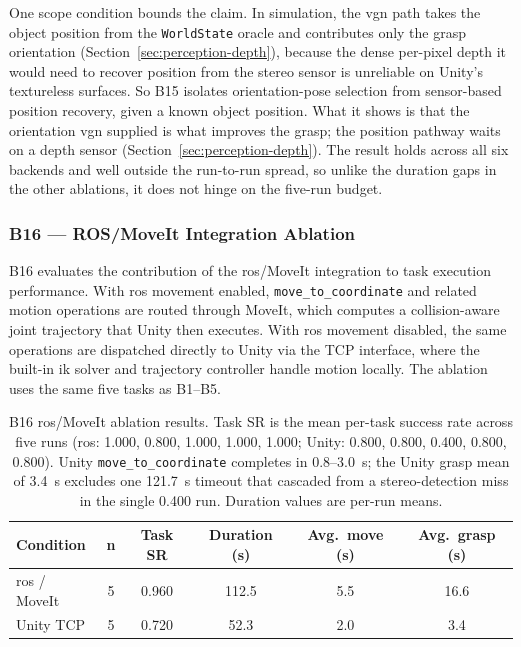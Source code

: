 \documentclass[
     12pt,
     a4paper,
     BCOR=10mm,
     DIV=14,
     listof=totoc,
     bibliography=totoc,
     parskip,
     twoside,
     headsepline
     ]{scrreprt}
\begin{document}
One scope condition bounds the claim. In simulation, the \gls{vgn} path takes the object position from the \texttt{WorldState} oracle and contributes only the grasp orientation (Section~\ref{sec:perception-depth}), because the dense per-pixel depth it would need to recover position from the stereo sensor is unreliable on Unity's textureless surfaces. So B15 isolates orientation-pose selection from sensor-based position recovery, given a known object position. What it shows is that the orientation \gls{vgn} supplied is what improves the grasp; the position pathway waits on a depth sensor (Section~\ref{sec:perception-depth}). The result holds across all six backends and well outside the run-to-run spread, so unlike the duration gaps in the other ablations, it does not hinge on the five-run budget.

\subsubsection{B16 --- ROS/MoveIt Integration Ablation}\label{sec:results-ros}
B16 evaluates the contribution of the \gls{ros}/MoveIt integration to task execution performance. With \gls{ros} movement enabled, \texttt{move\_to\_coordinate} and related motion operations are routed through MoveIt, which computes a collision-aware joint trajectory that Unity then executes. With \gls{ros} movement disabled, the same operations are dispatched directly to Unity via the TCP interface, where the built-in \gls{ik} solver and trajectory controller handle motion locally. The ablation uses the same five tasks as B1--B5.

\begin{table}[ht]
	\centering
	\begin{tabular}{lccccc}
		\hline
		\textbf{Condition}    & \textbf{n}              & \textbf{Task SR}         &
		\textbf{Duration (s)} & \textbf{Avg.\ move (s)} & \textbf{Avg.\ grasp (s)}                      \\
		\hline
		\gls{ros} / MoveIt    & 5                       & 0.960                    & 112.5 & 5.5 & 16.6 \\
		Unity TCP             & 5                       & 0.720                    & 52.3  & 2.0 & 3.4  \\
		\hline
	\end{tabular}
	\caption{B16 \gls{ros}/MoveIt ablation results. Task SR is the mean per-task success rate across five runs (\gls{ros}: 1.000, 0.800, 1.000, 1.000, 1.000; Unity: 0.800, 0.800, 0.400, 0.800, 0.800). Unity \texttt{move\_to\_coordinate} completes in 0.8--3.0~s; the Unity grasp mean of 3.4~s excludes one 121.7~s timeout that cascaded from a stereo-detection miss in the single 0.400 run. Duration values are per-run means.}
	\label{tab:b16-results}
\end{table}
\end{document}
